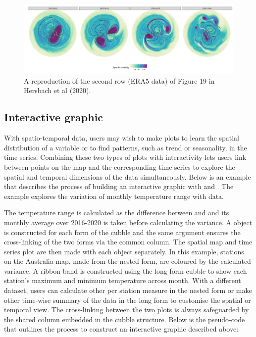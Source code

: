 \documentclass[
]{jss}
\begin{document}
\begin{CodeChunk}
\begin{figure}

{\centering \includegraphics[width=1\linewidth]{../figures/netcdf} 

}

\caption[A reproduction of the second row (ERA5 data) of Figure 19 in Hersbach et al (2020)]{A reproduction of the second row (ERA5 data) of Figure 19 in Hersbach et al (2020).}\label{fig:netcdf}
\end{figure}
\end{CodeChunk}

\hypertarget{interactive-graphic}{%
\subsection{Interactive graphic}\label{interactive-graphic}}

With spatio-temporal data, users may wish to make plots to learn the spatial distribution of a variable or to find patterns, such as trend or seasonality, in the time series. Combining these two types of plots with interactivity lets users link between points on the map and the corresponding time series to explore the spatial and temporal dimensions of the data simultaneously. Below is an example that describes the process of building an interactive graphic with  and . The example explores the variation of monthly temperature range with  data.

The temperature range is calculated as the difference between  and  and its monthly average over 2016-2020 is taken before calculating the variance. A  object is constructed for each form of the cubble and the same  argument ensures the cross-linking of the two forms via the common  column. The spatial map and time series plot are then made with each  object separately. In this example, stations on the Australia map, made from the nested form, are coloured by the calculated variance. A ribbon band is constructed using the long form cubble to show each station's maximum and minimum temperature across month. With a different dataset, users can calculate other per station measure in the nested form or make other time-wise summary of the data in the long form to customise the spatial or temporal view. The cross-linking between the two plots is always safeguarded by the shared  column embedded in the cubble structure. Below is the pseudo-code that outlines the process to construct an interactive graphic described above:
\end{document}
